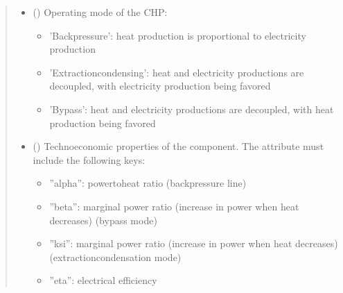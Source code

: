 \documentclass[letterpaper,10pt,english]{sphinxmanual}
\begin{document}
\begin{fulllineitems}
\begin{fulllineitems}
\begin{quote}
\begin{description}
\begin{itemize}
\item {} 
\sphinxAtStartPar
{} (\sphinxstyleliteralemphasis{\sphinxupquote{, }}\sphinxstyleliteralemphasis{\sphinxupquote{, }}) \textendash{} 
\sphinxAtStartPar
Operating mode of the CHP:
\begin{itemize}
\item {} 
\sphinxAtStartPar
’Back\sphinxhyphen{}pressure’: heat production is proportional to electricity production

\item {} 
\sphinxAtStartPar
’Extraction\sphinxhyphen{}condensing’: heat and electricity productions are decoupled, with electricity production being favored

\item {} 
\sphinxAtStartPar
’By\sphinxhyphen{}pass’: heat and electricity productions are decoupled, with heat production being favored

\end{itemize}


\item {} 
\sphinxAtStartPar
{} (\sphinxstyleliteralemphasis{\sphinxupquote{ | }}) \textendash{} 
\sphinxAtStartPar
Techno\sphinxhyphen{}economic properties of the component.
The  attribute must include the following keys:
\begin{itemize}
\item {} 
\sphinxAtStartPar
”alpha”: power\sphinxhyphen{}to\sphinxhyphen{}heat ratio
(back\sphinxhyphen{}pressure line)

\item {} 
\sphinxAtStartPar
”beta”: marginal power ratio (increase in power when heat decreases)
(by\sphinxhyphen{}pass mode)

\item {} 
\sphinxAtStartPar
”ksi”: marginal power ratio (increase in power when heat decreases)
(extraction\sphinxhyphen{}condensation mode)

\item {} 
\sphinxAtStartPar
”eta”: electrical efficiency


\end{itemize}
\end{itemize}
\end{description}
\end{quote}
\end{fulllineitems}
\end{fulllineitems}
\end{document}
